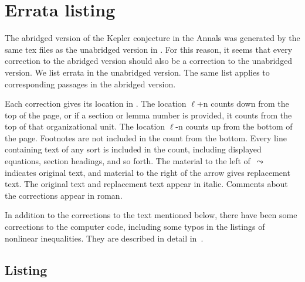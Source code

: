 \documentclass[11pt]{amsart}
\def\lto{\ensuremath{\,\leadsto\,}}
\def\line{$\ell$}
\begin{document}
\section{Errata listing}


The abridged version of the Kepler conjecture
in the Annals \cite{Hales:2005:Annals}
was generated by the same tex
files as the unabridged version in \cite{Hales:2006:DCG}.
For this reason,
it seems that every correction to
the abridged version should also be a correction to the unabridged version.
We list errata in the
unabridged version. The same list applies to corresponding 
passages in the abridged version.  



Each correction gives its location in \cite{Hales:2006:DCG}.
The location
\line+n counts down from the top of the page, or
if a section or lemma number is provided, it
counts from the top of that organizational unit.
The location \line-n counts up from the bottom
of the page. Footnotes are not included in the
count from the bottom.  Every line containing
text of any sort is included in the count,
including displayed equations, section headings,
and so forth.  The material to the left of $\lto$ 
indicates original text, and material to the right of the
arrow gives replacement text.  
The original text and replacement text appear in italic.
Comments about the corrections appear in roman. 
%


In addition to the corrections to the text mentioned below, 
there have been some corrections to the computer code, including some typos in the
listings of nonlinear inequalities.
They are described in detail in~\cite{Hales:2008:Errata}.


\subsection{Listing}\hfill\break
{}\baselineskip
\end{document}
